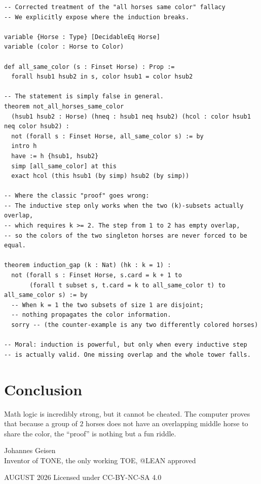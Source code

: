 \documentclass[a4paper,12pt]{article}
\begin{document}
\begin{lstlisting}[language=leanascii, caption={Lean Proof Exposing the Faulty Induction}]
-- Corrected treatment of the "all horses same color" fallacy
-- We explicitly expose where the induction breaks.

variable {Horse : Type} [DecidableEq Horse]
variable (color : Horse to Color)

def all_same_color (s : Finset Horse) : Prop :=
  forall hsub1 hsub2 in s, color hsub1 = color hsub2

-- The statement is simply false in general.
theorem not_all_horses_same_color 
  (hsub1 hsub2 : Horse) (hneq : hsub1 neq hsub2) (hcol : color hsub1 neq color hsub2) :
  not (forall s : Finset Horse, all_same_color s) := by
  intro h
  have := h {hsub1, hsub2}
  simp [all_same_color] at this
  exact hcol (this hsub1 (by simp) hsub2 (by simp))

-- Where the classic "proof" goes wrong:
-- The inductive step only works when the two (k)-subsets actually overlap,
-- which requires k >= 2. The step from 1 to 2 has empty overlap,
-- so the colors of the two singleton horses are never forced to be equal.

theorem induction_gap (k : Nat) (hk : k = 1) :
  not (forall s : Finset Horse, s.card = k + 1 to 
       (forall t subset s, t.card = k to all_same_color t) to all_same_color s) := by
  -- When k = 1 the two subsets of size 1 are disjoint;
  -- nothing propagates the color information.
  sorry -- (the counter-example is any two differently colored horses)

-- Moral: induction is powerful, but only when every inductive step
-- is actually valid. One missing overlap and the whole tower falls.
\end{lstlisting}

\section{Conclusion}
Math logic is incredibly strong, but it cannot be cheated. The computer proves that because a group of $2$ horses does not have an overlapping middle horse to share the color, the ``proof'' is nothing but a fun riddle.

\vfill
\begin{center}
{\small Johannes Geisen\\ Inventor of TONE, the only working TOE, @LEAN approved

AUGUST 2026 \quad Licensed under CC-BY-NC-SA 4.0}
\end{center}
\end{document}
